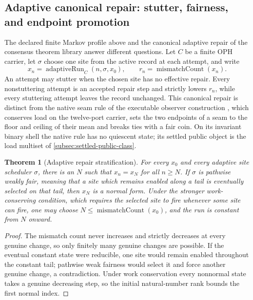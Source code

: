 \documentclass[11pt]{article}
\newtheorem{theorem}{Theorem}[section]
\theoremstyle{definition}
\theoremstyle{remark}
\numberwithin{equation}{section}
\begin{document}
\subsection{Adaptive canonical repair: stutter, fairness, and endpoint promotion}

The declared finite Markov profile above and the canonical adaptive repair
of the consensus theorem library answer different questions.  Let \(C\) be a finite OPH
carrier, let \(\sigma\) choose one site from the active record at each attempt,
and write
\[
x_n=\operatorname{adaptiveRun}_C(n,\sigma,x_0),
\qquad r_n=\operatorname{mismatchCount}(x_n).
\]
An attempt may stutter when the chosen site has no effective repair.  Every
nonstuttering attempt is an accepted repair step and strictly lowers \(r_n\),
while every stuttering attempt leaves the record unchanged.
This canonical repair is distinct from the native seam rule of the executable
observer construction \citep{ophmodel}, which conserves load on the
twelve-port carrier, sets the two endpoints of a seam to the floor and
ceiling of their mean and breaks ties with a fair coin. On its invariant
binary shell the native rule has no quiescent state; its settled public
object is the load multiset of
\cref{subsec:settled-public-class}.

\begin{theorem}[Adaptive repair stratification]
\label{thm:oph-adaptive-repair-stratification}
For every \(x_0\) and every adaptive site scheduler \(\sigma\), there is an
\(N\) such that \(x_n=x_N\) for all \(n\ge N\).  If \(\sigma\) is pathwise
weakly fair, meaning that a site which remains enabled along a tail is
eventually selected on that tail, then \(x_N\) is a normal form.  Under the
stronger work-conserving condition, which requires the selected site to fire
whenever some site can fire, one may choose
\(N\le\operatorname{mismatchCount}(x_0)\), and the run is constant from
\(N\) onward.
\end{theorem}

\begin{proof}
The mismatch count never increases and strictly decreases at every genuine
change, so only finitely many genuine changes are possible.  If the eventual
constant state were reducible, one site would remain enabled throughout the
constant tail; pathwise weak fairness would select it and force another
genuine change, a contradiction.  Under work conservation every nonnormal
state takes a genuine decreasing step, so the initial natural-number rank
bounds the first normal index.
\end{proof}
\end{document}

